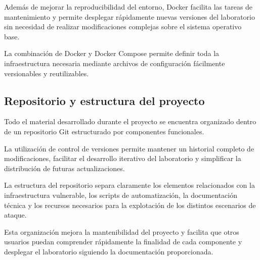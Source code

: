 Además de mejorar la reproducibilidad del entorno, Docker facilita las tareas de mantenimiento y permite desplegar rápidamente nuevas versiones del laboratorio sin necesidad de realizar modificaciones complejas sobre el sistema operativo base.

La combinación de Docker y Docker Compose permite definir toda la infraestructura necesaria mediante archivos de configuración fácilmente versionables y reutilizables.



\subsection{Repositorio y estructura del proyecto}

Todo el material desarrollado durante el proyecto se encuentra organizado dentro de un repositorio Git estructurado por componentes funcionales.

La utilización de control de versiones permite mantener un historial completo de modificaciones, facilitar el desarrollo iterativo del laboratorio y simplificar la distribución de futuras actualizaciones.

La estructura del repositorio separa claramente los elementos relacionados con la infraestructura vulnerable, los scripts de automatización, la documentación técnica y los recursos necesarios para la explotación de los distintos escenarios de ataque.

Esta organización mejora la mantenibilidad del proyecto y facilita que otros usuarios puedan comprender rápidamente la finalidad de cada componente y desplegar el laboratorio siguiendo la documentación proporcionada.

